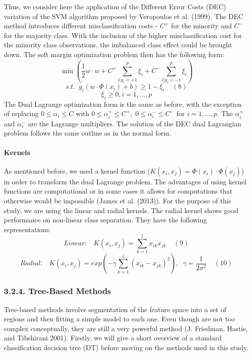\documentclass[12pt,]{article}
\let\oldparagraph\paragraph
\renewcommand{\paragraph}[1]{\oldparagraph{#1}\mbox{}}
\begin{document}
Thus, we consider here the application of the Different Error Costs
(DEC) variation of the SVM algorithm proposed by Veropoulos et al.
(1999). The DEC method introduces different misclassification costs -
\(C^+\) for the minority and \(C^-\) for the majority class. With the
inclusion of the higher misclassification cost for the minority class
observations, the imbalanced class effect could be brought down. The
soft margin optimization problem then has the following form:
\[\min{(\frac{1}{2}w \cdot w + C^+\sum_{i|y_i=+1}^{p}\xi_i + C^-\sum_{i|y_i=-1}^{p}\xi_i)}\]
\[s.t. \;\; y_i(w \cdot \Phi(x_i) + b) \geq 1 - \xi_i\;\;\;\;(8)\]
\[\xi_i \geq 0, i = 1,...,p\] The Dual Lagrange optimization form is the
same as before, with the exception of replacing \(0 \leq\alpha_i\leq C\)
with \(0 \leq\alpha_i^+\leq C^+, \; 0 \leq\alpha_i^-\leq C^-\) for
\(i=1,...,p\). The \(\alpha_i^+\) and \(\alpha_i^-\) are the Lagrange
multipliers. The solution of the DEC dual Lagrangian problem follows the
same outline as in the normal form.

\hypertarget{kernels}{%
\paragraph{Kernels}\label{kernels}}

As mentioned before, we used a kernel function
(\(K(x_i,x_j) = \Phi(x_i)\cdot \Phi(x_j)\)) in order to transform the
dual Lagrange problem. The advantages of using kernel functions are
computational or in some cases it allows for computations that otherwise
would be impossible (James et al. (2013)). For the purpose of this
study, we are using the linear and radial kernels. The radial kernel
shows good performance on non-linear class separation. They have the
following representations:
\[Linear: \;\;\; K(x_i,x_j) = \sum_{k=1}^{l}x_{ik}x_{jk}\;\;\;\;(9)\]
\[Radial: \;\;\; K(x_i,x_j) = exp(-\gamma\sum_{k=1}^{l}(x_{ik}-x_{jk})^2), \;\; \gamma=\frac{1}{2\sigma^2}\;\;\;\;(10)\]

\hypertarget{tree-based-methods}{%
\subsubsection{3.2.4. Tree-Based Methods}\label{tree-based-methods}}

Tree-based methods involve segmentation of the feature space into a set
of regions and then fitting a simple model to each one. Even though are
not too complex conceptually, they are still a very powerful method (J.
Friedman, Hastie, and Tibshirani 2001). Firstly, we will give a short
overview of a standard classification decision tree (DT) before moving
on the methods used in this study.
\end{document}

